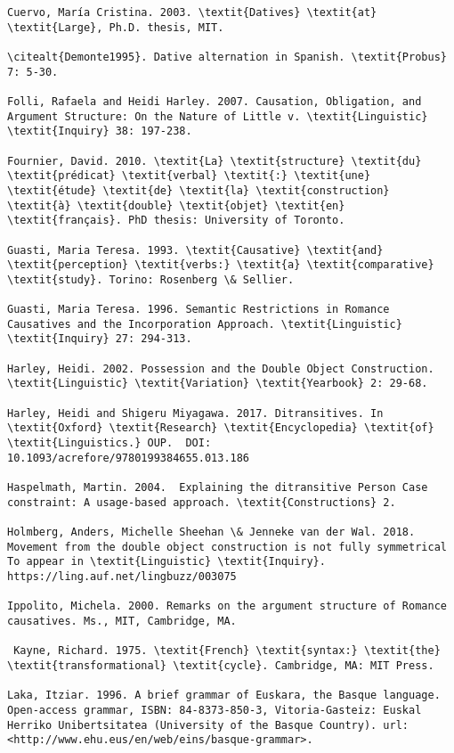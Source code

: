 \documentclass[output=paper,modfonts,nonflat]{langsci/langscibook}
\begin{document}
\begin{verbatim}
Cuervo, María Cristina. 2003. \textit{Datives} \textit{at} \textit{Large}, Ph.D. thesis, MIT. 

\citealt{Demonte1995}. Dative alternation in Spanish. \textit{Probus} 7: 5-30. 

Folli, Rafaela and Heidi Harley. 2007. Causation, Obligation, and Argument Structure: On the Nature of Little v. \textit{Linguistic} \textit{Inquiry} 38: 197-238.

Fournier, David. 2010. \textit{La} \textit{structure} \textit{du} \textit{prédicat} \textit{verbal} \textit{:} \textit{une} \textit{étude} \textit{de} \textit{la} \textit{construction} \textit{à} \textit{double} \textit{objet} \textit{en} \textit{français}. PhD thesis: University of Toronto.

Guasti, Maria Teresa. 1993. \textit{Causative} \textit{and} \textit{perception} \textit{verbs:} \textit{a} \textit{comparative} \textit{study}. Torino: Rosenberg \& Sellier.

Guasti, Maria Teresa. 1996. Semantic Restrictions in Romance Causatives and the Incorporation Approach. \textit{Linguistic} \textit{Inquiry} 27: 294-313.

Harley, Heidi. 2002. Possession and the Double Object Construction. \textit{Linguistic} \textit{Variation} \textit{Yearbook} 2: 29-68.

Harley, Heidi and Shigeru Miyagawa. 2017. Ditransitives. In \textit{Oxford} \textit{Research} \textit{Encyclopedia} \textit{of} \textit{Linguistics.} OUP.  DOI: 10.1093/acrefore/9780199384655.013.186

Haspelmath, Martin. 2004.  Explaining the ditransitive Person Case constraint: A usage-based approach. \textit{Constructions} 2. 

Holmberg, Anders, Michelle Sheehan \& Jenneke van der Wal. 2018.  Movement from the double object construction is not fully symmetrical To appear in \textit{Linguistic} \textit{Inquiry}. https://ling.auf.net/lingbuzz/003075 

Ippolito, Michela. 2000. Remarks on the argument structure of Romance causatives. Ms., MIT, Cambridge, MA.

 Kayne, Richard. 1975. \textit{French} \textit{syntax:} \textit{the} \textit{transformational} \textit{cycle}. Cambridge, MA: MIT Press.

Laka, Itziar. 1996. A brief grammar of Euskara, the Basque language. Open-access grammar, ISBN: 84-8373-850-3, Vitoria-Gasteiz: Euskal Herriko Unibertsitatea (University of the Basque Country). url: <http://www.ehu.eus/en/web/eins/basque-grammar>.


\end{verbatim}
\end{document}
